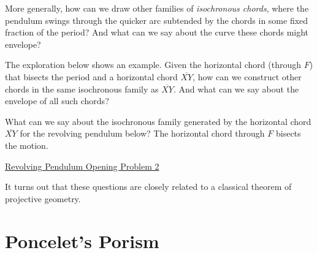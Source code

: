 \documentclass{ximera}
\begin{document}
More generally, how can we draw other families of \emph{isochronous chords}, where the pendulum swings through the quicker arc subtended by the chords in some fixed fraction of the period?  And what can we say about the curve these chords might envelope?

The exploration below shows an example. Given the horizontal chord (through $F$) that bisects the period and a horizontal chord $\overline{XY}$, how can we construct other chords in the same isochronous family as $\overline{XY}$. And what can we say about the envelope of all such chords?




\begin{exploration}
What can we say about the isochronous family generated by the horizontal chord $\overline{XY}$ for the revolving pendulum below? The horizontal chord through $F$ bisects the motion.

\begin{onlineOnly}
    \begin{center}
\end{center}
\end{onlineOnly}

\href{https://www.desmos.com/calculator/1kyfdn6yyc}{Revolving Pendulum Opening Problem 2}

\end{exploration}

It turns out that these questions are closely related to a classical theorem of projective geometry. %




\section*{Poncelet's Porism}


\end{document}
